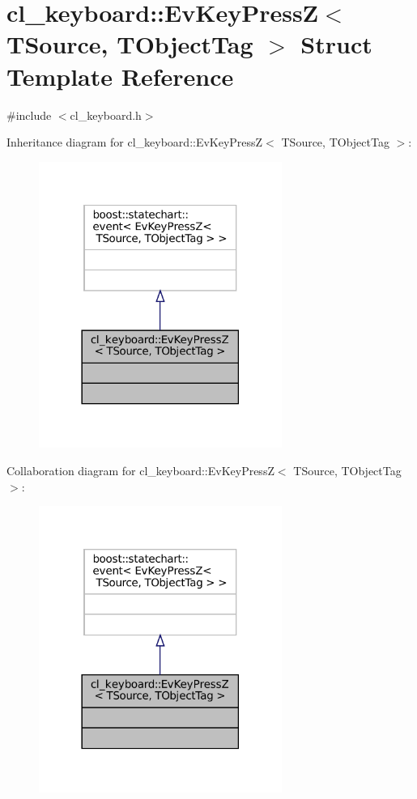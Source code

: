 \hypertarget{structcl__keyboard_1_1EvKeyPressZ}{}\section{cl\+\_\+keyboard\+:\+:Ev\+Key\+PressZ$<$ T\+Source, T\+Object\+Tag $>$ Struct Template Reference}
\label{structcl__keyboard_1_1EvKeyPressZ}


{\ttfamily \#include $<$cl\+\_\+keyboard.\+h$>$}



Inheritance diagram for cl\+\_\+keyboard\+:\+:Ev\+Key\+PressZ$<$ T\+Source, T\+Object\+Tag $>$\+:
\nopagebreak
\begin{figure}[H]
\begin{center}
\leavevmode
\includegraphics[width=225pt]{structcl__keyboard_1_1EvKeyPressZ__inherit__graph}
\end{center}
\end{figure}


Collaboration diagram for cl\+\_\+keyboard\+:\+:Ev\+Key\+PressZ$<$ T\+Source, T\+Object\+Tag $>$\+:
\nopagebreak
\begin{figure}[H]
\begin{center}
\leavevmode
\includegraphics[width=225pt]{structcl__keyboard_1_1EvKeyPressZ__coll__graph}
\end{center}
\end{figure}


